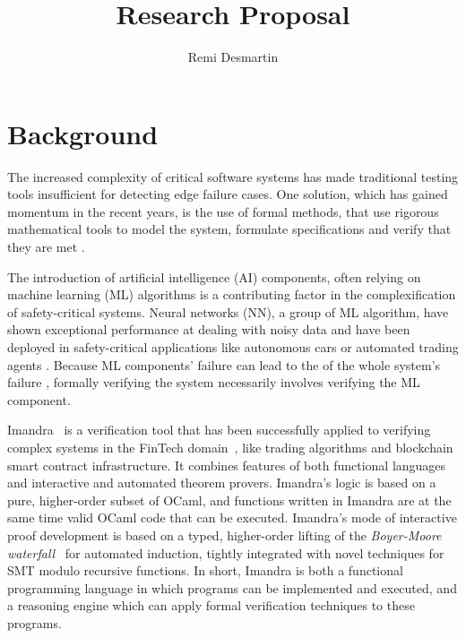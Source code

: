 \documentclass[]{article}
\title{Research Proposal}
\author{Remi Desmartin}
\begin{document}
\maketitle

\iffalse
\begin{abstract}

\end{abstract}
\fi

\section{Background}
The increased complexity of critical software systems has made traditional testing tools insufficient for detecting edge failure cases. One solution, which has gained momentum in the recent years, is the use of formal methods, that use rigorous mathematical tools to model the system, formulate specifications and verify that they are met \cite{noauthor_how_nodate}. 

The introduction of artificial intelligence (AI) components, often relying on machine learning (ML) algorithms is a contributing factor in the complexification of safety-critical systems. Neural networks (NN), a group of ML algorithm, have shown exceptional performance at dealing with noisy data and have been deployed in safety-critical applications like autonomous cars \cite{} or automated trading agents \cite{bao}. Because ML components' failure can lead to the of the whole system's failure \cite{car_paper}, formally verifying the system necessarily involves verifying the ML component.

Imandra~\cite{PassmoreCIABKKM20} is a verification tool that has been successfully applied to verifying complex systems in the FinTech
domain~\cite{Passmore21}, like trading algorithms and blockchain smart contract infrastructure. 
It combines features of both functional languages and interactive and automated theorem 
provers. Imandra's logic is based on a pure, higher-order subset of OCaml, and
functions written in Imandra are at the same time valid OCaml code that can be
executed. Imandra's mode of interactive proof
development is based on a typed, higher-order lifting of the \emph{Boyer-Moore
	waterfall}~\cite{BM79} for automated induction, tightly integrated with novel
techniques for SMT modulo recursive functions. 
In short, Imandra is both a functional programming language in which programs can be implemented and executed, and a reasoning engine which can apply formal verification techniques to these programs.
\end{document}
